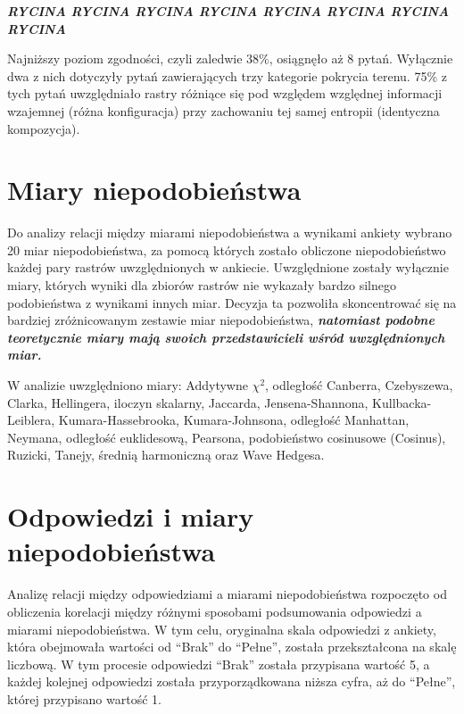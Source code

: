 \documentclass{amuthesis}
\begin{document}
\textbf{\emph{RYCINA RYCINA RYCINA RYCINA RYCINA RYCINA RYCINA RYCINA }}

Najniższy poziom zgodności, czyli zaledwie 38\%, osiągnęło aż 8 pytań.
Wyłącznie dwa z nich dotyczyły pytań zawierających trzy kategorie
pokrycia terenu. 75\% z tych pytań uwzględniało rastry różniące się pod
względem względnej informacji wzajemnej (różna konfiguracja) przy
zachowaniu tej samej entropii (identyczna kompozycja).

\hypertarget{miary-niepodobieux144stwa}{%
\section{Miary niepodobieństwa}\label{miary-niepodobieux144stwa}}

Do analizy relacji między miarami niepodobieństwa a wynikami ankiety
wybrano 20 miar niepodobieństwa, za pomocą których zostało obliczone
niepodobieństwo każdej pary rastrów uwzględnionych w ankiecie.
Uwzględnione zostały wyłącznie miary, których wyniki dla zbiorów rastrów
nie wykazały bardzo silnego podobieństwa z wynikami innych miar. Decyzja
ta pozwoliła skoncentrować się na bardziej zróżnicowanym zestawie miar
niepodobieństwa, \textbf{\emph{natomiast podobne teoretycznie miary mają
swoich przedstawicieli wśród uwzględnionych miar.}}

W analizie uwzględniono miary: Addytywne \(\chi^2\), odległość Canberra,
Czebyszewa, Clarka, Hellingera, iloczyn skalarny, Jaccarda,
Jensena-Shannona, Kullbacka-Leiblera, Kumara-Hassebrooka,
Kumara-Johnsona, odległość Manhattan, Neymana, odległość euklidesową,
Pearsona, podobieństwo cosinusowe (Cosinus), Ruzicki, Tanejy, średnią
harmoniczną oraz Wave Hedgesa.

\hypertarget{odpowiedzi-i-miary-niepodobieux144stwa}{%
\section{Odpowiedzi i miary
niepodobieństwa}\label{odpowiedzi-i-miary-niepodobieux144stwa}}

Analizę relacji między odpowiedziami a miarami niepodobieństwa
rozpoczęto od obliczenia korelacji między różnymi sposobami podsumowania
odpowiedzi a miarami niepodobieństwa. W tym celu, oryginalna skala
odpowiedzi z ankiety, która obejmowała wartości od ``Brak'' do
``Pełne'', została przekształcona na skalę liczbową. W tym procesie
odpowiedzi ``Brak'' została przypisana wartość 5, a każdej kolejnej
odpowiedzi została przyporządkowana niższa cyfra, aż do ``Pełne'',
której przypisano wartość 1.
\end{document}
